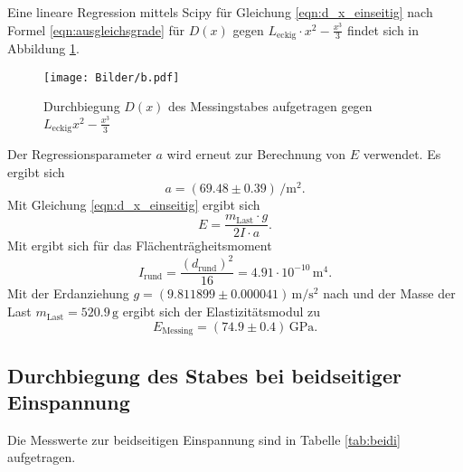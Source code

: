 Eine lineare Regression mittels Scipy \cite{scipy} für Gleichung \eqref{eqn:d_x_einseitig} nach Formel \eqref{eqn:ausgleichsgrade} für $D(x)$ gegen $L_{\mathrm{eckig}}\cdot x^2-\frac{x^3}{3}$
findet sich in Abbildung \ref{fig:messing_einseitig}.

\begin{figure}
	\centering
	\texttt{[image: Bilder/b.pdf]}
	\caption{Durchbiegung $D(x)$ des Messingstabes aufgetragen gegen $L_{\mathrm{eckig}}x^2-\frac{x^3}{3}$}
	\label{fig:messing_einseitig}
\end{figure}
Der Regressionsparameter $a$ wird erneut zur Berechnung von $E$ verwendet.
Es ergibt sich
\begin{equation*}
	a=(69.48 \pm 0.39) \,\si{\per\square\meter} \text{.}
\end{equation*}
Mit Gleichung \eqref{eqn:d_x_einseitig} ergibt sich
\begin{equation}
	E=\frac{m_{\mathrm{Last}}\cdot g}{2I\cdot a} \text{.}
\end{equation}
Mit \cite{bla} ergibt sich für das Flächenträgheitsmoment
\begin{equation}
	I_{\mathrm{rund}}=\frac{(d_{\mathrm{rund}})^2}{16}= 4.91 \cdot 10^{-10} \,\si{\meter\tothe{4}}	 \text{.}
\end{equation}
Mit der Erdanziehung $g=(9.811899 \pm 0.000041) \,\si{\meter\per\square\second}$ nach \cite{G} und der Masse der Last $m_{\mathrm{Last}}=520.9\,\si{\gram}$ ergibt sich der Elastizitätsmodul zu
\begin{equation*}
	E_{\mathrm{Messing}}= (74.9 \pm 0.4)\,\si{\giga\pascal} \text{.}
\end{equation*}

\FloatBarrier
\subsection{Durchbiegung des Stabes bei beidseitiger Einspannung}

Die Messwerte zur beidseitigen Einspannung sind in Tabelle \ref{tab:beidi} aufgetragen.



